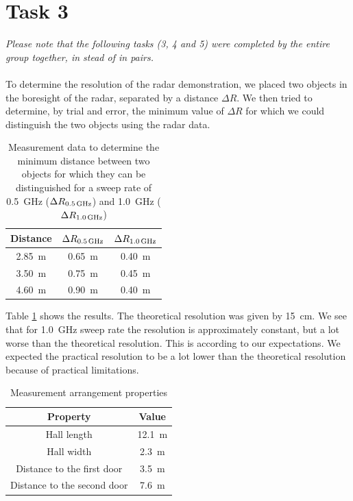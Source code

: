 \documentclass[11pt,titlepage]{report}
\begin{document}
\section{Task 3}
\emph{Please note that the following tasks (3, 4 and 5) were completed by the entire group together, in stead of in pairs.} 
\\\\
To determine the resolution of the radar demonstration, we placed two objects in the boresight of the radar, separated by a distance $\Delta R$. We then tried to determine, by trial and error, the minimum value of $\Delta R$ for which we could distinguish the two objects using the radar data.

\begin{table}[H]
	\centering
	\caption{Measurement data to determine the minimum distance between two objects for which they can be distinguished for a sweep rate of \SI{0.5}{GHz} ($\Delta R_{\text{\SI{0.5}{GHz}}}$) and \SI{1.0}{GHz} ($\Delta R_{\text{\SI{1.0}{GHz}}}$)}
	\label{tab:ass-2-dist-obj}
	\begin{tabular}{c c c}
		\hline\hline
		Distance & $\Delta R_{\text{\SI{0.5}{GHz}}}$ & $\Delta R_{\text{\SI{1.0}{GHz}}}$ \\
		\hline
		\SI{2.85}{m} & \SI{0.65}{m} & \SI{0.40}{m} \\
		\SI{3.50}{m} & \SI{0.75}{m} & \SI{0.45}{m} \\
		\SI{4.60}{m} & \SI{0.90}{m} & \SI{0.40}{m} \\
		\hline
	\end{tabular}
\end{table}

Table \ref{tab:ass-2-dist-obj} shows the results. The theoretical resolution was given by \SI{15}{cm}. We see that for \SI{1.0}{GHz} sweep rate the resolution is approximately constant, but a lot worse than the theoretical resolution. This is according to our expectations. We expected the practical resolution to be a lot lower than the theoretical resolution because of practical limitations.

\begin{table}[H]
	\centering
	\caption{Measurement arrangement properties}
	\label{tab:ass-2-arr}
	\begin{tabular}{c c}
		\hline\hline
		Property & Value \\
		\hline
		Hall length & \SI{12.1}{m} \\
		Hall width & \SI{2.3}{m} \\
		Distance to the first door & \SI{3.5}{m} \\
		Distance to the second door & \SI{7.6}{m} \\
		\hline
	\end{tabular}
\end{table}
\end{document}

